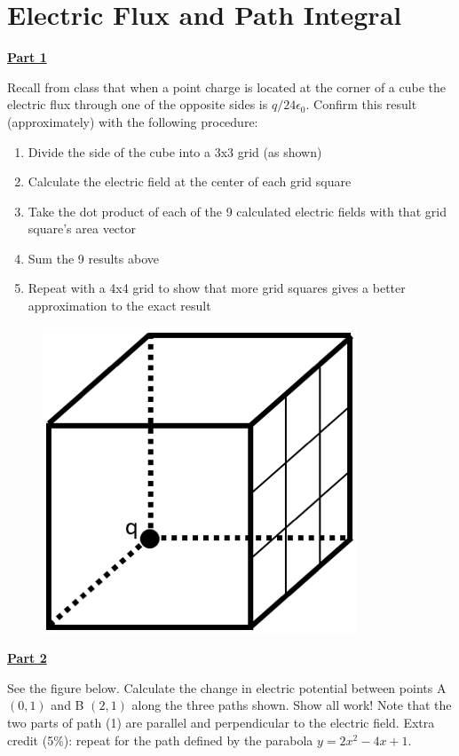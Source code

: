\section{Electric Flux and Path Integral}

\underline{\textbf{Part 1}} \par
Recall from class that when a point charge is located at the corner of a cube the electric flux through one of the opposite sides is $q / 24 \epsilon_0$.
Confirm this result (approximately) with the following procedure:

\begin{enumerate}
\item Divide the side of the cube into a 3x3 grid (as shown)
\item Calculate the electric field at the center of each grid square
\item Take the dot product of each of the 9 calculated electric fields with that grid square's area vector
\item Sum the 9 results above
\item Repeat with a 4x4 grid to show that more grid squares gives a better approximation to the exact result
\end{enumerate}

\begin{figure}[H]
\includegraphics[scale=1.0]{figures/electric-flux-and-path-integral/fig1.png}
\end{figure}

\underline{\textbf{Part 2}} \par

See the figure below.
Calculate the change in electric potential between points A $(0, 1)$ and B $(2, 1)$ along the three paths shown.
Show all work!
Note that the two parts of path (1) are parallel and perpendicular to the electric field.
Extra credit (5\%): repeat for the path defined by the parabola $y = 2x^2 - 4x + 1$.

